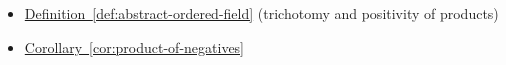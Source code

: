 \begin{dependencies}
\begin{itemize}
  \item \hyperref[def:abstract-ordered-field]{Definition~\ref*{def:abstract-ordered-field}}
        \textnormal{(trichotomy and positivity of products)}
  \item \hyperref[cor:product-of-negatives]{Corollary~\ref*{cor:product-of-negatives}}
\end{itemize}
\end{dependencies}

\clearpage
